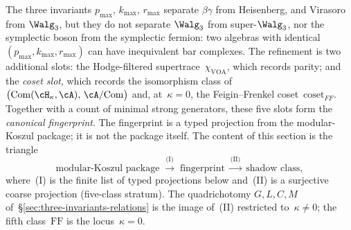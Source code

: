 The three invariants $p_{\max}$, $k_{\max}$, $r_{\max}$ separate
$\beta\gamma$ from Heisenberg, and Virasoro from $\Walg_3$, but they
do not separate $\Walg_3$ from super-$\Walg_3$, nor the symplectic
boson from the symplectic fermion: two algebras with identical
$(p_{\max}, k_{\max}, r_{\max})$ can have inequivalent bar complexes.
The refinement is two additional slots: the Hodge-filtered
supertrace~$\chi_{\mathrm{VOA}}$, which records parity; and the
\emph{coset slot}, which records the isomorphism class of
$\bigl(\mathrm{Com}(\cH_\kappa, \cA),\, \cA/\mathrm{Com}\bigr)$
and, at~$\kappa = 0$, the Feigin--Frenkel coset~$\mathrm{coset}_{FF}$.
Together with a count of minimal strong generators, these five slots
form the \emph{canonical fingerprint}. The fingerprint is a typed
projection from the modular-Koszul package; it is not the package
itself. The content of this section is the triangle
\begin{equation}\label{eq:fingerprint-triangle}
\text{modular-Koszul package}\;\overset{\text{(I)}}{\longrightarrow}\;\text{fingerprint}\;\overset{\text{(II)}}{\longrightarrow}\;\text{shadow class},
\end{equation}
where~(I) is the finite list of typed projections below and~(II) is
a surjective coarse projection (five-class stratum). The quadrichotomy
$G, L, C, M$
of~\S\ref{sec:three-invariants-relations} is the image of~(II)
restricted to~$\kappa \neq 0$; the fifth class~$\mathrm{FF}$ is the
locus~$\kappa = 0$.

